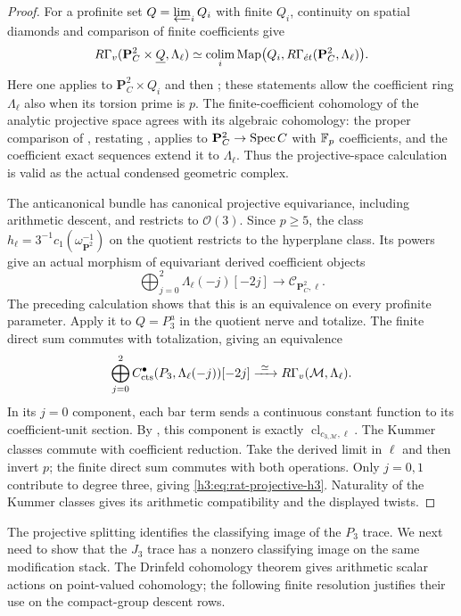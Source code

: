 \begin{proof}
For a profinite set
$Q=\varprojlim_iQ_i$ with finite $Q_i$, continuity on spatial
diamonds and comparison of finite coefficients give
\[
 R\Gamma_v(\mathbf P^2_C\times\underline Q,\Lambda_\ell)
  \simeq\operatorname*{colim}_i\operatorname{Map}\bigl(Q_i,
                 R\Gamma_{\acute et}(\mathbf P^2_C,\Lambda_\ell)\bigr).
\]
Here one applies \cite[Proposition~14.9]{ScholzeDiamonds} to
$\mathbf P^2_C\times Q_i$ and then
\cite[Proposition~14.10 and Lemma~15.6]{ScholzeDiamonds}; these statements
allow the coefficient ring $\Lambda_\ell$ also when its torsion
prime is $p$.  The finite-coefficient cohomology of the analytic
projective space agrees with its algebraic cohomology: the
proper comparison of \cite[Theorem~3.12]{ScholzeSurvey},
restating \cite[Theorem~3.7.2]{Huber}, applies to
$\mathbf P^2_C\to\operatorname{Spec} C$ with $\mathbb F_p$ coefficients, and
the coefficient exact sequences extend it to $\Lambda_\ell$.
Thus the projective-space calculation is valid as the actual
condensed geometric complex.

The anticanonical bundle has canonical projective equivariance,
including arithmetic descent, and restricts to $\mathcal O(3)$.
Since $p\geq5$, the class
$h_\ell=3^{-1}c_1(\omega_{\mathbf P^2}^{-1})$
on the quotient restricts to the hyperplane class.  Its powers
give an actual morphism of equivariant derived coefficient objects
\[
 \bigoplus_{j=0}^2\Lambda_\ell(-j)[-2j]
       \longrightarrow\mathscr C_{\mathbf P^2_C,\ell}.
\]
The preceding calculation shows that this is an equivalence on
every profinite parameter.  Apply it to $Q=P_3^a$ in the quotient
nerve and totalize.  The finite direct sum commutes with
totalization, giving an equivalence
\[
 \bigoplus_{j=0}^2
 C^\bullet_{\mathrm{cts}}(P_3,\Lambda_\ell(-j))[-2j]
       \xrightarrow{\ \simeq\ }
 R\Gamma_v(\mathcal M,\Lambda_\ell).
\]
In its $j=0$ component, each bar term sends a continuous constant
function to its coefficient-unit section.  By
, this component is exactly
$\operatorname{cl}_{c_{3,\mathcal M},\ell}$.
The Kummer classes commute with coefficient reduction.  Take the
derived limit in $\ell$ and then invert $p$; the finite direct sum
commutes with both operations.  Only $j=0,1$ contribute to degree
three, giving \eqref{h3:eq:rat-projective-h3}.  Naturality of the
Kummer classes gives its arithmetic compatibility and the
displayed twists.
\end{proof}

The projective splitting identifies the classifying image of the
$P_3$ trace.  We next need to show that the $J_3$ trace has a
nonzero classifying image on the same modification stack.  The
Drinfeld cohomology theorem gives arithmetic scalar actions on
point-valued cohomology; the following finite resolution justifies
their use on the compact-group descent rows.

